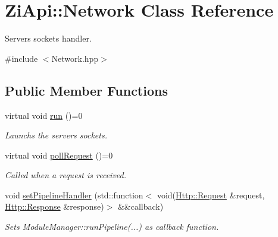 \hypertarget{classZiApi_1_1Network}{}\section{Zi\+Api\+::Network Class Reference}
\label{classZiApi_1_1Network}


Server\textquotesingle{}s sockets handler.  




{\ttfamily \#include $<$Network.\+hpp$>$}

\subsection*{Public Member Functions}
\begin{DoxyCompactItemize}
\item 
\mbox{\label{classZiApi_1_1Network_a0556864740b66ea8085ab8a03a260267}} 
virtual void \mbox{\hyperlink{classZiApi_1_1Network_a0556864740b66ea8085ab8a03a260267}{run}} ()=0
\begin{DoxyCompactList}\small\item\em Launchs the server\textquotesingle{}s sockets. \end{DoxyCompactList}\item 
virtual void \mbox{\hyperlink{classZiApi_1_1Network_a965edba3c55b9c268af44af7f204be66}{poll\+Request}} ()=0
\begin{DoxyCompactList}\small\item\em Called when a request is received. \end{DoxyCompactList}\item 
void \mbox{\hyperlink{classZiApi_1_1Network_a781d6d87558f714e93d89e098039ee27}{set\+Pipeline\+Handler}} (std\+::function$<$ void(\mbox{\hyperlink{classHttp_1_1Request}{Http\+::\+Request}} \&request, \mbox{\hyperlink{classHttp_1_1Response}{Http\+::\+Response}} \&response)$>$ \&\&callback)
\begin{DoxyCompactList}\small\item\em Sets Module\+Manager\+::run\+Pipeline(...) as callback function. \end{DoxyCompactList}\end{DoxyCompactItemize}
